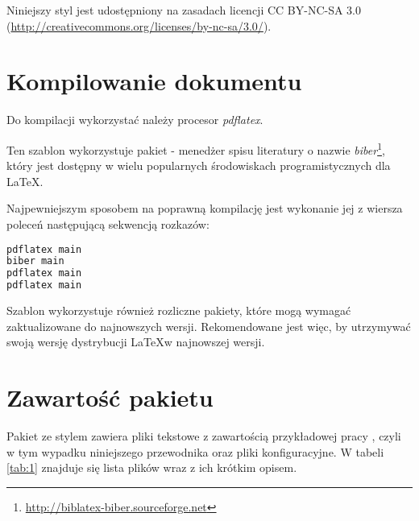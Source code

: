 Niniejszy styl jest udostępniony na zasadach licencji CC BY-NC-SA 3.0 ({\url{http://creativecommons.org/licenses/by-nc-sa/3.0/}}).


\section{Kompilowanie dokumentu}

Do kompilacji wykorzystać należy procesor {\em pdflatex}.

Ten szablon wykorzystuje pakiet - menedżer spisu literatury o nazwie {\em biber}\footnote{ \url{http://biblatex-biber.sourceforge.net}}, który jest dostępny w wielu popularnych środowiskach programistycznych dla \LaTeX.

Najpewniejszym sposobem na poprawną kompilację jest wykonanie jej z wiersza poleceń następującą sekwencją rozkazów:

\begin{lstlisting}[language=bash, caption=Skrypt kompilujący, label=alg:1]
pdflatex main
biber main
pdflatex main
pdflatex main

\end{lstlisting}

Szablon wykorzystuje również rozliczne pakiety, które mogą wymagać
zaktualizowane do najnowszych wersji. Rekomendowane jest więc, by utrzymywać swoją wersję dystrybucji \LaTeX w najnowszej wersji.


\section{Zawartość pakietu}

Pakiet ze stylem zawiera pliki tekstowe z zawartością przykładowej pracy , czyli w tym wypadku niniejszego przewodnika oraz pliki konfiguracyjne. W tabeli \ref{tab:1} znajduje się lista plików wraz z ich krótkim opisem.

